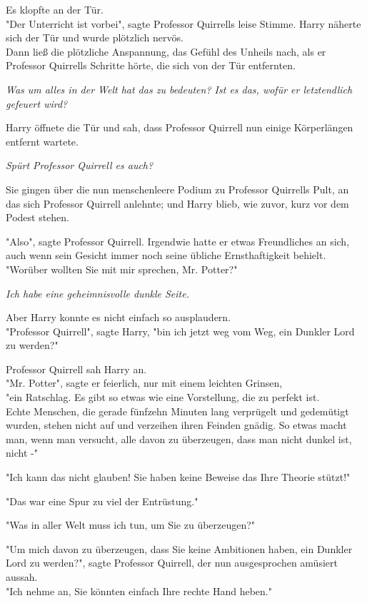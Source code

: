 {Es klopfte an der Tür.\\ "Der Unterricht ist vorbei", sagte Professor Quirrells leise Stimme. Harry näherte sich der Tür und wurde plötzlich nervös.\\ Dann ließ die plötzliche Anspannung, das Gefühl des Unheils nach, als er Professor Quirrells Schritte hörte, die sich von der Tür entfernten.

\emph{Was um alles in der Welt hat das zu bedeuten? Ist es das, wofür er letztendlich gefeuert wird?}

Harry öffnete die Tür und sah, dass Professor Quirrell nun einige Körperlängen entfernt wartete.

\emph{Spürt Professor Quirrell es auch?}

Sie gingen über die nun menschenleere Podium zu Professor Quirrells Pult, an das sich Professor Quirrell anlehnte; und Harry blieb, wie zuvor, kurz vor dem Podest stehen.

"Also", sagte Professor Quirrell. Irgendwie hatte er etwas Freundliches an sich, auch wenn sein Gesicht immer noch seine übliche Ernsthaftigkeit behielt.\\ "Worüber wollten Sie mit mir sprechen, Mr. Potter?"

\emph{Ich habe eine geheimnisvolle dunkle Seite.}

Aber Harry konnte es nicht einfach so ausplaudern.\\ "Professor Quirrell", sagte Harry, "bin ich jetzt weg vom Weg, ein Dunkler Lord zu werden?"

Professor Quirrell sah Harry an.\\ "Mr. Potter", sagte er feierlich, nur mit einem leichten Grinsen,\\ "ein Ratschlag. Es gibt so etwas wie eine Vorstellung, die zu perfekt ist.\\ Echte Menschen, die gerade fünfzehn Minuten lang verprügelt und gedemütigt wurden, stehen nicht auf und verzeihen ihren Feinden gnädig. So etwas macht man, wenn man versucht, alle davon zu überzeugen, dass man nicht dunkel ist, nicht -"

"Ich kann das nicht glauben! Sie haben keine Beweise das Ihre Theorie stützt!"

"Das war eine Spur zu viel der Entrüstung."

"Was in aller Welt muss ich tun, um Sie zu überzeugen?"

"Um mich davon zu überzeugen, dass Sie keine Ambitionen haben, ein Dunkler Lord zu werden?", sagte Professor Quirrell, der nun ausgesprochen amüsiert aussah.\\ "Ich nehme an, Sie könnten einfach Ihre rechte Hand heben."

}
